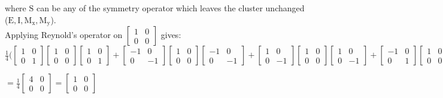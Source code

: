 \documentclass[a4paper]{article}
\begin{document}
where $\mathrm{S}$ can be any of the symmetry operator which leaves the cluster unchanged ($\mathrm{E},\mathrm{I},\mathrm{M}_{\mathrm{x}}, \mathrm{M}_{\mathrm{y}}$).\\   
Applying Reynold's operator on $\begin{bmatrix} 1 & 0 \\ 0 & 0 \end{bmatrix}$ gives:\\
$    \frac{1}{4} \Bigg(\begin{bmatrix} 1 & 0 \\ 0 & 1 \end{bmatrix} \begin{bmatrix} 1 & 0 \\ 0 & 0\end{bmatrix} \begin{bmatrix} 1 & 0 \\ 0 & 1 \end{bmatrix} + 
\begin{bmatrix} -1 & 0 \\ 0 & -1 \end{bmatrix} \begin{bmatrix} 1 & 0 \\ 0 & 0\end{bmatrix} \begin{bmatrix} -1 & 0 \\ 0 & -1 \end{bmatrix} +  
\begin{bmatrix} 1 & 0 \\ 0 & -1 \end{bmatrix} \begin{bmatrix} 1 & 0 \\ 0 & 0\end{bmatrix} \begin{bmatrix} 1 & 0 \\ 0 & -1 \end{bmatrix} + 
\begin{bmatrix} -1 & 0 \\ 0 & 1 \end{bmatrix} \begin{bmatrix} 1 & 0 \\ 0 & 0\end{bmatrix} \begin{bmatrix} -1 & 0 \\ 0 & 1 \end{bmatrix} \Bigg)$\\
\begin{center} 
$= \frac{1}{4}\begin{bmatrix} 4 & 0 \\ 0 & 0 \end{bmatrix} = \begin{bmatrix} 1 & 0 \\ 0 & 0 \end{bmatrix} $
\end{center}
\end{document}
